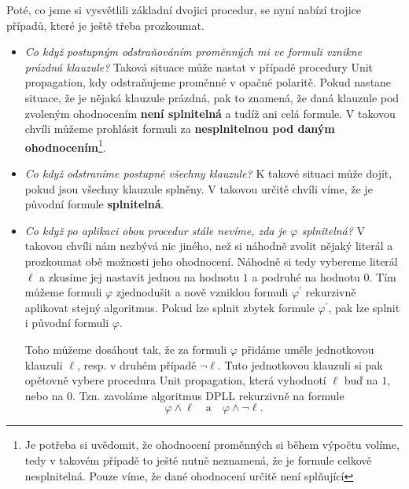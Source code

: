 Poté, co jsme si vysvětlili základní dvojici procedur, se nyní nabízí trojice případů, které je ještě třeba prozkoumat.
\begin{itemize}
    \item \emph{Co když postupným odstraňováním proměnných mi ve formuli vznikne prázdná klauzule?} Taková situace může nastat v případě procedury Unit propagation, kdy odstraňujeme proměnné v opačné polaritě. Pokud nastane situace, že je nějaká klauzule prázdná, pak to znamená, že daná klauzule pod zvoleným ohodnocením \textbf{není splnitelná} a tudíž ani celá formule. V takovou chvíli můžeme prohlásit formuli za \textbf{nesplnitelnou pod daným ohodnocením}\footnote{Je potřeba si uvědomit, že ohodnocení proměnných si během výpočtu volíme, tedy v takovém případě to ještě nutně neznamená, že je formule celkově nesplnitelná. Pouze víme, že dané ohodnocení určitě není splňující}.
    \item \emph{Co když odstraníme postupně všechny klauzule?} K takové situaci může dojít, pokud jsou všechny klauzule splněny. V takovou určitě chvíli víme, že je původní formule \textbf{splnitelná}.
    \item \emph{Co když po aplikaci obou procedur stále nevíme, zda je $\varphi$ splnitelná?} V takovou chvíli nám nezbývá nic jiného, než si náhodně zvolit nějaký literál a prozkoumat obě možnosti jeho ohodnocení. Náhodně si tedy vybereme literál $\ell$ a zkusíme jej nastavit jednou na hodnotu $1$ a podruhé na hodnotu $0$. Tím můžeme formuli $\varphi$ zjednodušit a nově vzniklou formuli $\varphi^\prime$ rekurzivně aplikovat stejný algoritmus. Pokud lze splnit zbytek formule $\varphi^\prime$, pak lze splnit i původní formuli $\varphi$.
    
    Toho můžeme dosáhout tak, že za formuli $\varphi$ přidáme uměle jednotkovou klauzuli $\ell$, resp. v druhém případě $\neg\ell$. Tuto jednotkovou klauzuli si pak opětovně vybere procedura Unit propagation, která vyhodnotí $\ell$ buď na $1$, nebo na $0$. Tzn. zavoláme algoritmus DPLL rekurzivně na formule
    \[\varphi\land\ell\quad\text{a}\quad\varphi\land\neg\ell.\]
\end{itemize}


